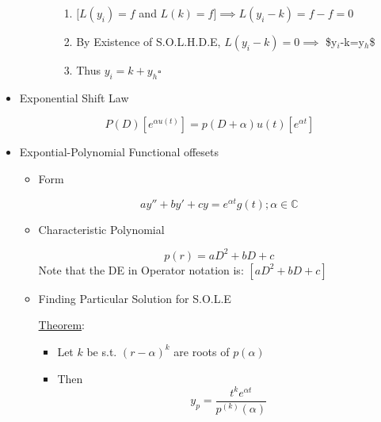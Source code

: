 \documentclass[11pt]{article}
\begin{document}
\begin{itemize}
\begin{enumerate}
\begin{enumerate}
\begin{enumerate}
\item $[L(y_i)=f$ and $L(k)=f] \implies L(y_i-k) = f-f=0$
\item By Existence of S.O.L.H.D.E, $L(y_i-k)=0 \implies$ \$y$_i$-k=y$_h$\$
\item Thus $y_i=k+y_h \square$
\end{enumerate}

\end{enumerate}

\end{enumerate}

\item Exponential Shift Law\\
\label{sec-9.2.5.3}

     \begin{equation}
     P(D)[e^{\alpha u(t)}]=p(D+\alpha)u(t)[e^{\alpha t}]
     \end{equation}

\item Expontial-Polynomial Functional offesets\\
\label{sec-9.2.5.4}

\begin{itemize}

\item Form\\
\label{sec-9.2.5.4.1}

      \begin{equation}
      ay''+by'+cy=e^{\alpha t}g(t); \alpha\in\mathbb{C}
      \end{equation}

\item Characteristic Polynomial\\
\label{sec-9.2.5.4.2}

      \begin{equation}
      p(r)=aD^2+bD+c
      \end{equation}
      Note that the DE in Operator notation is: $[aD^2+bD+c]$

\item Finding Particular Solution for S.O.L.E\\
\label{sec-9.2.5.4.3}

      \underline{Theorem}:
\begin{itemize}
\item Let $k$ be s.t. $(r-\alpha)^k$ are roots of $p(\alpha)$
\item Then 
        \begin{equation}
        y_p=\frac{t^ke^{\alpha t}}{p^{(k)}(\alpha)}
        \end{equation}
\end{itemize}


\end{itemize}
\end{itemize}
\end{document}
